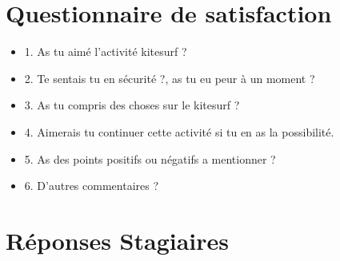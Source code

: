 \documentclass[11pt,a4paper]{report}
\begin{document}
\chapter{Questionnaire de satisfaction\label{questionnaire}}
\begin{itemize}
\item 1. As tu aimé l'activité kitesurf ?
\item 2. Te sentais tu en sécurité ?, as tu eu peur à un moment ?
\item 3. As tu compris des choses sur le kitesurf ?
\item 4. Aimerais tu continuer cette activité si tu en as la possibilité.
\item 5. As des points positifs ou négatifs a mentionner ?
\item 6. D'autres commentaires ?
\end{itemize}

\chapter{Réponses Stagiaires\label{reponses}}
\end{document}

